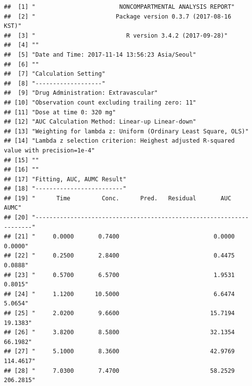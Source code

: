 \documentclass[12pt,]{krantz}
\begin{document}
\begin{verbatim}
##  [1] "                        NONCOMPARTMENTAL ANALYSIS REPORT"                           
##  [2] "                       Package version 0.3.7 (2017-08-16 KST)"                      
##  [3] "                          R version 3.4.2 (2017-09-28)"                             
##  [4] ""                                                                                   
##  [5] "Date and Time: 2017-11-14 13:56:23 Asia/Seoul"                                      
##  [6] ""                                                                                   
##  [7] "Calculation Setting"                                                                
##  [8] "-------------------"                                                                
##  [9] "Drug Administration: Extravascular"                                                 
## [10] "Observation count excluding trailing zero: 11"                                      
## [11] "Dose at time 0: 320 mg"                                                             
## [12] "AUC Calculation Method: Linear-up Linear-down"                                      
## [13] "Weighting for lambda z: Uniform (Ordinary Least Square, OLS)"                       
## [14] "Lambda z selection criterion: Heighest adjusted R-squared value with precision=1e-4"
## [15] ""                                                                                   
## [16] ""                                                                                   
## [17] "Fitting, AUC, AUMC Result"                                                          
## [18] "-------------------------"                                                          
## [19] "      Time         Conc.      Pred.   Residual       AUC       AUMC"                
## [20] "---------------------------------------------------------------------"              
## [21] "     0.0000       0.7400                           0.0000     0.0000"               
## [22] "     0.2500       2.8400                           0.4475     0.0888"               
## [23] "     0.5700       6.5700                           1.9531     0.8015"               
## [24] "     1.1200      10.5000                           6.6474     5.0654"               
## [25] "     2.0200       9.6600                          15.7194    19.1383"               
## [26] "     3.8200       8.5800                          32.1354    66.1982"               
## [27] "     5.1000       8.3600                          42.9769   114.4617"               
## [28] "     7.0300       7.4700                          58.2529   206.2815"               

\end{verbatim}
\end{document}
